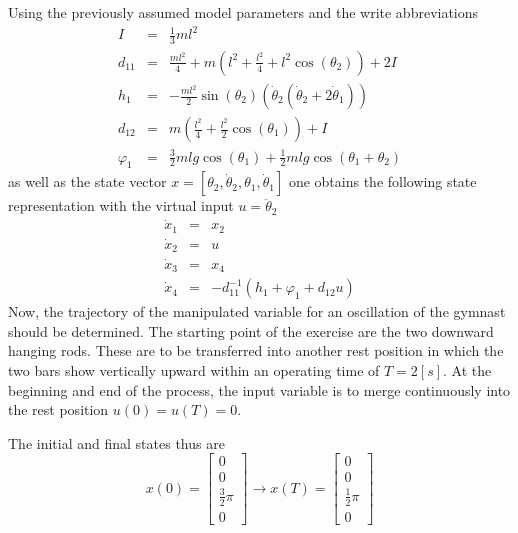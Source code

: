 \documentclass[letterpaper,10pt,english]{sphinxmanual}
\begin{document}
Using the previously assumed model parameters and the write abbreviations
\begin{eqnarray*}
   I      & = & \frac{1}{3}m l^2 \\
   d_{11} & = & \frac{m l^2}{4} + m(l^2 + \frac{l^2}{4} + l^2 \cos(\theta_2)) + 2I \\
   h_1    & = & - \frac{m l^2}{2} \sin(\theta_2) (\dot{\theta}_2 (\dot{\theta}_2 + 2\dot{\theta}_1)) \\
   d_{12} & = & m (\frac{l^2}{4} + \frac{l^2}{2} \cos(\theta_1)) + I \\
   \varphi_1 & = & \frac{3}{2}m l g \cos(\theta_1) + \frac{1}{2}m l g \cos(\theta_1 + \theta_2)
 \end{eqnarray*}
as well as the state vector \(x = [\theta_2, \dot{\theta}_2, \theta_1, \dot{\theta}_1]\) one obtains
the following state representation with the virtual input \(u = \ddot{\theta}_2\)
\begin{eqnarray*}
   \dot{x}_1 & = & x_2 \\
   \dot{x}_2 & = & u \\
   \dot{x}_3 & = & x_4 \\
   \dot{x}_4 & = & -d_{11}^{-1} (h_1 + \varphi_1 + d_{12}u)
\end{eqnarray*}
Now, the trajectory of the manipulated variable for an oscillation of the gymnast should be determined.
The starting point of the exercise are the two downward hanging rods. These are to be transferred into another
rest position in which the two bars show vertically upward within an operating time of \(T = 2 [s]\).
At the beginning and end of the process, the input variable is to merge continuously into the rest
position \(u(0) = u(T) = 0\).

The initial and final states thus are
\begin{equation*}
   x(0) = \begin{bmatrix} 0 \\ 0 \\ \frac{3}{2} \pi \\ 0 \end{bmatrix}
   \rightarrow
   x(T) = \begin{bmatrix} 0 \\ 0 \\ \frac{1}{2} \pi \\ 0 \end{bmatrix}
\end{equation*}
\end{document}
